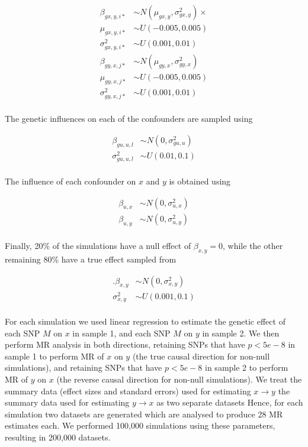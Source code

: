 \documentclass[]{article}
\begin{document}
\[
\begin{aligned}
\beta_{gx,y,i*} & \sim N(\mu_{gx,y}, \sigma^2_{gx,y}) \times  \\
\mu_{gx,y,i*} & \sim U(-0.005, 0.005) \\
\sigma^2_{gx,y,i*} & \sim U(0.001, 0.01) \\
\beta_{gy,x,j*} & \sim N(\mu_{gy,x}, \sigma^2_{gy,x}) \\
\mu_{gy,x,j*} & \sim U(-0.005, 0.005) \\
\sigma^2_{gy,x,j*} & \sim U(0.001, 0.01) \\
\end{aligned}
\]

The genetic influences on each of the confounders are sampled using

\[
\begin{aligned}
\beta_{gu,u,l} & \sim N(0, \sigma^2_{gu,u}) \\
\sigma^2_{gu,u,l} & \sim U(0.01, 0.1) \\
\end{aligned}
\]

The influence of each confounder on \(x\) and \(y\) is obtained using

\[
\begin{aligned}
\beta_{u,x} & \sim N(0, \sigma^{2}_{u,x}) \\
\beta_{u,y} & \sim N(0, \sigma^{2}_{u,y}) \\
\end{aligned}
\]

Finally, 20\% of the simulations have a null effect of
\(\beta_{x,y} = 0\), while the other remaining 80\% have a true effect
sampled from

\[
\begin{aligned}.
\beta_{x,y} & \sim N(0, \sigma^2_{x,y}) \\
\sigma^2_{x,y} & \sim U(0.001, 0.1) \\
\end{aligned}
\]

For each simulation we used linear regression to estimate the genetic
effect of each SNP \(M\) on \(x\) in sample 1, and each SNP \(M\) on
\(y\) in sample 2. We then perform MR analysis in both directions,
retaining SNPs that have \(p < 5e-8\) in sample 1 to perform MR of \(x\)
on \(y\) (the true causal direction for non-null simulations), and
retaining SNPs that have \(p < 5e-8\) in sample 2 to perform MR of \(y\)
on \(x\) (the reverse causal direction for non-null simulations). We
treat the summary data (effect sizes and standard errors) used for
estimating \(x \rightarrow y\) the summary data used for estimating
\(y \rightarrow x\) as two separate datasets Hence, for each simulation
two datasets are generated which are analysed to produce 28 MR estimates
each. We performed 100,000 simulations using these parameters, resulting
in 200,000 datasets.
\end{document}
